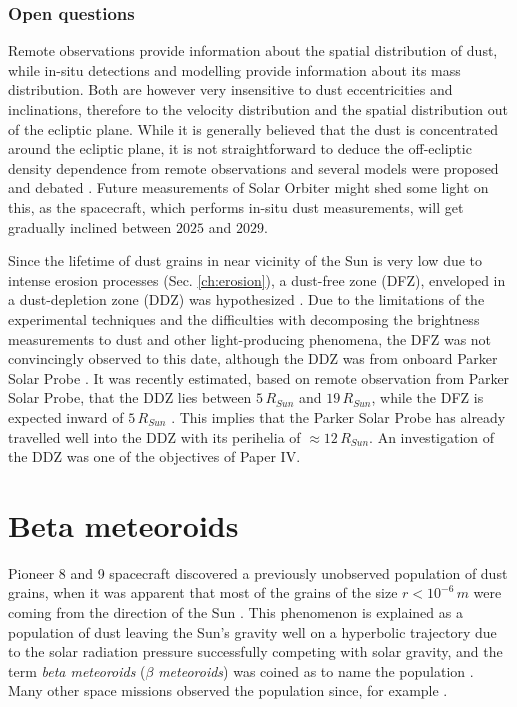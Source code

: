 \subsubsection{Open questions}

Remote observations provide information about the spatial distribution of dust, while in-situ detections and modelling provide information about its mass distribution. Both are however very insensitive to dust eccentricities and inclinations, therefore to the velocity distribution and the spatial distribution out of the ecliptic plane. While it is generally believed that the dust is concentrated around the ecliptic plane, it is not straightforward to deduce the off-ecliptic density dependence from remote observations and several models were proposed and debated \citep{giese1986three}. Future measurements of Solar Orbiter might shed some light on this, as the spacecraft, which performs in-situ dust measurements, will get gradually inclined between $2025$ and $2029$.

Since the lifetime of dust grains in near vicinity of the Sun is very low due to intense erosion processes (Sec. \ref{ch:erosion}), a dust-free zone (DFZ), enveloped in a dust-depletion zone (DDZ) was hypothesized \citep{russell1929meteoric}. Due to the limitations of the experimental techniques and the difficulties with decomposing the brightness measurements to dust and other light-producing phenomena, the DFZ was not convincingly observed to this date, although the DDZ was from onboard Parker Solar Probe \cite{stenborg2018characterization}. It was recently estimated, based on remote observation from Parker Solar Probe, that the DDZ lies between $5 \, R_{Sun}$ and $19 \, R_{Sun}$, while the DFZ is expected inward of $5 \, R_{Sun}$ \citep{stenborg2022psp}. This implies that the Parker Solar Probe has already travelled well into the DDZ with its perihelia of $\approx 12 \, R_{Sun}$. An investigation of the DDZ was one of the objectives of Paper IV.

\section{Beta meteoroids}

Pioneer 8 and 9 spacecraft discovered a previously unobserved population of dust grains, when it was apparent that most of the grains of the size $r < 10^{-6} \, \si{m}$ were coming from the direction of the Sun \cite{berg1973evidence}. This phenomenon is explained as a population of dust leaving the Sun's gravity well on a hyperbolic trajectory due to the solar radiation pressure successfully competing with solar gravity, and the term \textit{beta meteoroids} ($\beta$ \textit{meteoroids}) was coined as to name the population \cite{zook1975source}. Many other space missions observed the population since, for example \cite{zaslavsky2012interplanetary,malaspina2014interplanetary,zaslavsky2021first}.

